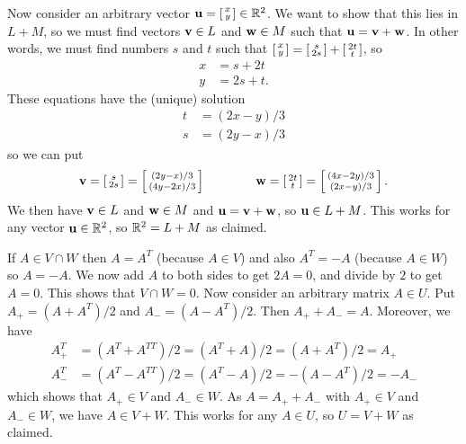  Now consider an arbitrary vector
 $\mathbf{u}=\left[\begin{smallmatrix} x\\ y\end{smallmatrix}\right]\in{\mathbb{R}}^2$.  We want to show that this
 lies in $L+M$, so we must find vectors $\mathbf{v}\in L$ and
 $\mathbf{w}\in M$ such that $\mathbf{u}=\mathbf{v}+\mathbf{w}$.  In other words, we
 must find numbers $s$ and $t$ such that
 $\left[\begin{smallmatrix} x\\ y\end{smallmatrix}\right]=\left[\begin{smallmatrix} s\\ 2s\end{smallmatrix}\right] + \left[\begin{smallmatrix} 2t\\ t\end{smallmatrix}\right]$,
 so
 \begin{align*}
  x &= s+2t \\
  y &= 2s+t.
 \end{align*}
 These equations have the (unique) solution
 \begin{align*}
  t &= (2x-y)/3 \\
  s &= (2y-x)/3
 \end{align*}
 so we can put
 \[ \mathbf{v} = \left[\begin{smallmatrix} s\\ 2s\end{smallmatrix}\right] = \left[\begin{smallmatrix} (2y-x)/3 \\ (4y-2x)/3 \end{smallmatrix}\right]
    \hspace{4em}
    \mathbf{w} = \left[\begin{smallmatrix} 2t\\ t\end{smallmatrix}\right] = \left[\begin{smallmatrix} (4x-2y)/3 \\ (2x-y)/3 \end{smallmatrix}\right].
 \]
 We then have $\mathbf{v}\in L$ and $\mathbf{w}\in M$ and $\mathbf{u}=\mathbf{v}+\mathbf{w}$,
 so $\mathbf{u}\in L+M$.  This works for any vector $\mathbf{u}\in{\mathbb{R}}^2$,
 so ${\mathbb{R}}^2=L+M$ as claimed.
\EndDeferredSolution

 If $A\in V\cap W$ then $A=A^T$ (because $A\in V$) and also
 $A^T=-A$ (because $A\in W$) so $A=-A$.  We now add $A$ to
 both sides to get $2A=0$, and divide by $2$ to get $A=0$.
 This shows that $V\cap W=0$.  Now consider an arbitrary
 matrix $A\in U$.  Put $A_+=(A+A^T)/2$ and $A_-=(A-A^T)/2$.
 Then $A_++A_-=A$.  Moreover, we have
 \begin{align*}
  A_+^T &=(A^T+A^{TT})/2=(A^T+A)/2=(A+A^T)/2 = A_+ \\
  A_-^T &=(A^T-A^{TT})/2=(A^T-A)/2=-(A-A^T)/2 = -A_-
 \end{align*}
 which shows that $A_+\in V$ and $A_-\in W$.  As $A=A_++A_-$
 with $A_+\in V$ and $A_-\in W$, we have $A\in V+W$.  This
 works for any $A\in U$, so $U=V+W$ as claimed.
\EndDeferredSolution

